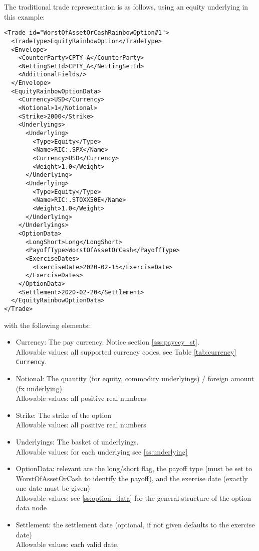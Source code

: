 The traditional trade representation is as follows, using an equity underlying in this example:

\begin{verbatim}
<Trade id="WorstOfAssetOrCashRainbowOption#1">
  <TradeType>EquityRainbowOption</TradeType>
  <Envelope>
    <CounterParty>CPTY_A</CounterParty>
    <NettingSetId>CPTY_A</NettingSetId>
    <AdditionalFields/>
  </Envelope>
  <EquityRainbowOptionData>
    <Currency>USD</Currency>
    <Notional>1</Notional>
    <Strike>2000</Strike>
    <Underlyings>
      <Underlying>
        <Type>Equity</Type>
        <Name>RIC:.SPX</Name>
        <Currency>USD</Currency>
        <Weight>1.0</Weight>
      </Underlying>
      <Underlying>
        <Type>Equity</Type>
        <Name>RIC:.STOXX50E</Name>
        <Weight>1.0</Weight>
      </Underlying>
    </Underlyings>
    <OptionData>
      <LongShort>Long</LongShort>
      <PayoffType>WorstOfAssetOrCash</PayoffType>
      <ExerciseDates>
        <ExerciseDate>2020-02-15</ExerciseDate>
      </ExerciseDates>
    </OptionData>
    <Settlement>2020-02-20</Settlement>
  </EquityRainbowOptionData>
</Trade>
\end{verbatim}

with the following elements:

\begin{itemize}
\item Currency: The pay currency. Notice section \ref{sss:payccy_st}. \\
  Allowable values: all supported currency codes, see Table \ref{tab:currency} \lstinline!Currency!.
\item Notional: The quantity (for equity, commodity underlyings) / foreign amount (fx underlying) \\
  Allowable values: all positive real numbers
\item Strike: The strike of the option \\
  Allowable values: all positive real numbers
\item Underlyings: The basket of underlyings. \\
  Allowable values: for each underlying see \ref{ss:underlying}
\item OptionData: relevant are the long/short flag, the payoff type (must be set to WorstOfAssetOrCash to
  identify the payoff), and the exercise date (exactly one date must be given) \\
  Allowable values: see \ref{ss:option_data} for the general structure of the option data node
\item Settlement: the settlement date (optional, if not given defaults to the exercise date) \\
  Allowable values: each valid date.
\end{itemize}

